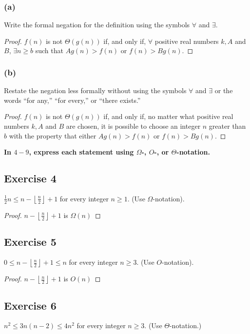 \documentclass[14pt]{extarticle}
\newcommand{\dps}{\displaystyle}
\newcommand{\fa}{\forall}
\newcommand{\te}{\exists}
\newcommand{\cy}{\color{cyan}}
\newcommand{\floor}[1]{{\left\lfloor#1\right\rfloor}}
\begin{document}
\subsubsection{(a)}
Write the formal negation for the definition using the symbols \(\fa\) and \(\te\).

\begin{proof}
\(f(n)\) is not \(\Theta(g(n))\) if, and only if, \(\fa\) positive real numbers \(k, A\) and \(B\), \(\te n \geq b\) such that \(Ag(n) > f(n)\) or \(f(n) > Bg(n)\).
\end{proof}

\subsubsection{(b)}
Restate the negation less formally without using the symbols \(\fa\) and \(\te\) or the words “for any,” “for every,” or 
“there exists.”

\begin{proof}
\(f(n)\) is not \(\Theta(g(n))\) if, and only if, no matter what positive real numbers \(k, A\) and \(B\) are chosen, it 
is possible to choose an integer \(n\) greater than \(b\) with the property that either \(Ag(n) > f(n)\) or \(f(n) > Bg(n)\).
\end{proof}

{\bf \cy In \(4-9\), express each statement using \(\Omega\)-, \(O\)-, or \(\Theta\)-notation.}

\subsection{Exercise 4}
\(\dps \frac{1}{2}n \leq n - \floor{\frac{n}{2}} + 1\) for every integer \(n \geq 1\). (Use \(\Omega\)-notation).

\begin{proof}
\(\dps n - \floor{\frac{n}{2}} + 1\) is \(\Omega(n)\)
\end{proof}

\subsection{Exercise 5}
\(\dps 0 \leq n - \floor{\frac{n}{2}} + 1 \leq n\) for every integer \(n \geq 3\). (Use \(O\)-notation).

\begin{proof}
\(\dps n - \floor{\frac{n}{2}} + 1\) is \(O(n)\)
\end{proof}

\subsection{Exercise 6}
\(n^2 \leq 3n(n - 2) \leq 4n^2\) for every integer \(n \geq 3\). (Use \(\Theta\)-notation.)
\end{document}
